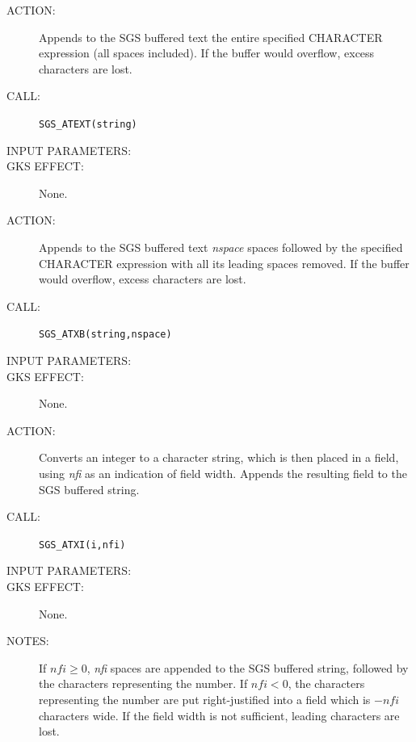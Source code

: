\documentclass[11pt]{article}
\begin{document}
\begin{description}
\item [ACTION:]
Appends to the SGS buffered text the entire specified CHARACTER expression (all
spaces included).
If the buffer would overflow, excess characters are lost.
\item [CALL:]
{\tt SGS\_ATEXT(string)}
\item [INPUT PARAMETERS:]
\begin{params}
\end{params}
\item [GKS EFFECT:]
None.
\end{description}
\goodbreak

\begin{description}
\item [ACTION:]
Appends to the SGS buffered text {\em nspace}\/ spaces followed by the specified
CHARACTER expression with all its leading spaces removed.
If the buffer would overflow, excess characters are lost.
\item [CALL:]
{\tt SGS\_ATXB(string,nspace)}
\item [INPUT PARAMETERS:]
\begin{params}
\end{params}
\item [GKS EFFECT:]
None.
\end{description}
\goodbreak

\begin{description}
\item [ACTION:]
Converts an integer to a character string, which is then placed in a field,
using {\em nfi}\/ as an indication of field width.
Appends the resulting field to the SGS buffered string.
\item [CALL:]
{\tt SGS\_ATXI(i,nfi)}
\item [INPUT PARAMETERS:]
\begin{params}
\end{params}
\item [GKS EFFECT:]
None.
\item [NOTES:]
If $\mathit{nfi}\geq 0$, {\it nfi} spaces are appended to the SGS buffered
string, followed by the characters representing the number.
If $\mathit{nfi}<0$, the characters representing the number are put
right-justified into a field which is $-\mathit{nfi}$ characters wide.
If the field width is not sufficient, leading characters are lost.
\end{description}
\goodbreak
\end{document}
